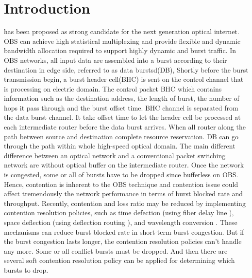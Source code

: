 \section{Introduction}

 has been proposed as strong candidate for the next generation
optical internet. OBS can achieve high statistical multiplexing and
provide flexible and dynamic bandwidth allocation required to support
highly dynamic and burst traffic\cite{ref:obs}.  In OBS networks, all input data
are assembled into a burst according to their destination in edge side, referred to
as data burstsd(DB), Shortly before the burst transmission begin, a
burst header cell(BHC) is sent on the control channel that is
processing on electric domain. The control packet BHC which contains 
information such as the destination address, the length of burst, the
number of hops it pass through and the burst offset time. BHC channel
is separated from the data burst channel. It take offset time to let 
the header cell be processed at each intermediate router before the data 
burst arrives. When all router along the path between source and destination 
complete resource reservation. DB can go through the path within whole
high-speed optical domain. The main different difference between an
optical network and a conventional packet switching network are
without optical buffer on the intermediate router. Once the network is congested,
some or all of bursts have to be dropped since bufferless on OBS. 
Hence, contention is inherent to the OBS technique and contention issue 
could affect tremendously the network performance in
terms of burst blocked rate and throughput. Recently, contention and loss
ratio may be reduced by implementing contention resolution policies,
such as time defection (using fiber delay line \cite{ref:fdl}), space 
deflection (using deflection routing \cite{ref:deflect}), and wavelength 
conversion \cite{ref:conversion}. These mechanisms can reduce burst blocked
rate in short-term burst congestion. But if the burst congestion 
lasts longer, the contention resolution policies can't handle any more. 
Some or all conflict bursts must be dropped. And then there are several soft contention
resolution policy can be applied for determining which bursts to drop.

